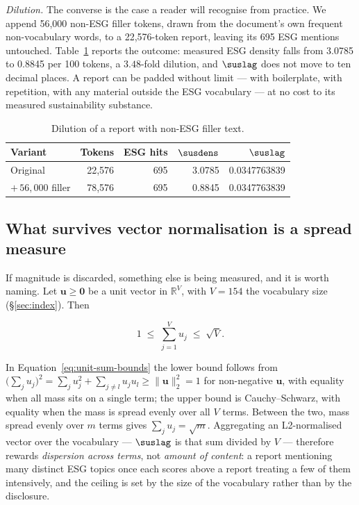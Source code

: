 \emph{Dilution.} The converse is the case a reader will recognise from practice. We append
56{,}000 non-ESG filler tokens, drawn from the document's own frequent non-vocabulary words,
to a 22{,}576-token report, leaving its 695 ESG mentions untouched.
Table~\ref{tab:measurement-dilution} reports the outcome: measured ESG density falls from
3.0785 to 0.8845 per 100 tokens, a $3.48$-fold dilution, and $\suslag$ does not move to ten
decimal places. A report can be padded without limit --- with boilerplate, with repetition,
with any material outside the ESG vocabulary --- at no cost to its measured sustainability
substance.

\begin{table}[ht]
\centering
\caption{Dilution of a report with non-ESG filler text.}
\label{tab:measurement-dilution}
\begin{tabular}{lrrrr}
\toprule
Variant & Tokens & ESG hits & $\susdens$ & $\suslag$ \\
\midrule
Original             & 22{,}576 & 695 & 3.0785 & 0.0347763839 \\
$+\,56{,}000$ filler & 78{,}576 & 695 & 0.8845 & 0.0347763839 \\
\bottomrule
\end{tabular}
\end{table}

\subsection{What survives vector normalisation is a spread measure}

If magnitude is discarded, something else is being measured, and it is worth naming. Let
$\mathbf{u} \geq \mathbf{0}$ be a unit vector in $\mathbb{R}^{V}$, with $V = 154$ the
vocabulary size (\S\ref{sec:index}). Then

\begin{equation}
1 \;\leq\; \sum_{j=1}^{V} u_j \;\leq\; \sqrt{V}.
\label{eq:unit-sum-bounds}
\end{equation}

In Equation~\eqref{eq:unit-sum-bounds} the lower bound follows from
$\bigl(\sum_j u_j\bigr)^2 = \sum_j u_j^2 + \sum_{j \neq l} u_j
u_l \geq \lVert \mathbf{u} \rVert_2^2 = 1$ for non-negative $\mathbf{u}$, with equality when
all mass sits on a single term; the upper bound is Cauchy--Schwarz, with equality when the
mass is spread evenly over all $V$ terms. Between the two, mass spread evenly over $m$ terms
gives $\sum_j u_j = \sqrt{m}$. Aggregating an L2-normalised vector over the vocabulary ---
$\suslag$ is that sum divided by $V$ --- therefore rewards \emph{dispersion across terms},
not \emph{amount of content}: a report mentioning many distinct ESG topics once each scores
above a report treating a few of them intensively, and the ceiling is set by the size of the
vocabulary rather than by the disclosure.

